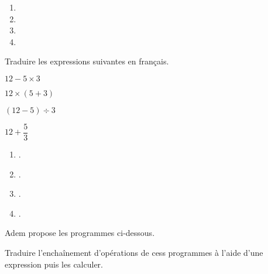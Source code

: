 \begin{Maquette}[Fiche,CorrigeFin,Colonnes=2]{}
\begin{multicols}{2}
      \begin{Solution}
         \begin{enumerate}
            \item {}
            \item {} \smallskip
            \item {} \smallskip
            \item {}
         \end{enumerate}
      \end{Solution}
   
      
      \begin{exercice}[Dur] %
         Traduire les expressions suivantes en français.
         \begin{colenumerate}
            \item $12-5\times3$
            \item $12\times(5+3)$
            \item $(12-5)\div3$
            \item $12+\dfrac{5}{3}$
         \end{colenumerate}
      \end{exercice}

      \begin{Solution}
         \begin{enumerate}
            \item {}.
            \item {}.
            \item {}.
            \item {}.
         \end{enumerate}
      \end{Solution}
      
      
      \begin{exercice} %
         Adem propose les programmes ci-dessous. \par
         Traduire l'enchaînement d'opérations de cess programmes à l'aide d'une expression puis les calculer.
         \begin{multicols}{2}
            \small
         \end{multicols}
      \end{exercice}


\end{multicols}
\end{Maquette}
